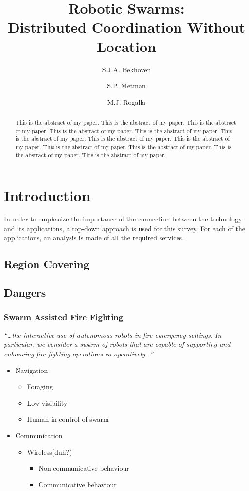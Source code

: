 \documentclass[a4paper]{article}
\title{Robotic Swarms: \\Distributed Coordination Without Location}
\author{S.J.A. Bekhoven  \and
    S.P. Metman \and
    M.J. Rogalla}
\date{}
\begin{document}
\maketitle
\thispagestyle{empty}

\begin{abstract}
This is the abstract of my paper.
This is the abstract of my paper.
This is the abstract of my paper.
This is the abstract of my paper.
This is the abstract of my paper.
This is the abstract of my paper.
This is the abstract of my paper.
This is the abstract of my paper.
This is the abstract of my paper.
This is the abstract of my paper.
This is the abstract of my paper.
This is the abstract of my paper.
\end{abstract}


\section{Introduction}
  In order to emphasize the importance of the connection between the technology and its applications, a top-down approach is used for this survey. For each of the applications, an analysis is made of all the required services.

  \subsection{Region Covering}
  \subsection{Dangers}
  \subsubsection{Swarm Assisted Fire Fighting}
  \emph{``\ldots the interactive use of autonomous robots in fire emergency settings. In particular, we consider a swarm of robots that are capable of supporting and enhancing fire fighting operations co-operatively\ldots''\cite{Naghsh2008}}
  \begin{itemize}
    \item Navigation
      \begin{itemize}
        \item Foraging
        \item Low-visibility
        \item Human in control of swarm
      \end{itemize}
    \item Communication
    \begin{itemize}
        \item Wireless(duh?)
        \begin{itemize}
          \item Non-communicative behaviour
          \item Communicative behaviour
        \end{itemize}
      \end{itemize}
  \end{itemize}
\end{document}
